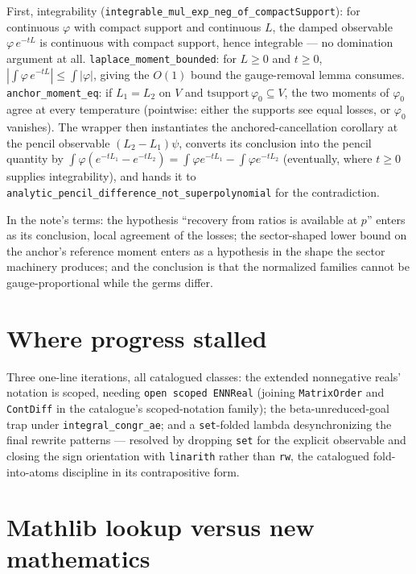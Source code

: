 \documentclass[11pt]{article}
\newcommand{\code}[1]{\texttt{#1}}
\begin{document}
First, integrability
(\code{integrable\_mul\_exp\_neg\_of\_compactSupport}): for
continuous $\varphi$ with compact support and continuous $L$, the damped
observable $\varphi\, e^{-tL}$ is continuous with compact support,
hence integrable --- no domination argument at all.
\code{laplace\_moment\_bounded}: for $L \ge 0$ and $t \ge 0$,
$|\int \varphi\, e^{-tL}| \le \int |\varphi|$, giving the
$O(1)$ bound the gauge-removal lemma consumes.
\code{anchor\_moment\_eq}: if $L_1 = L_2$ on $V$ and
$\mathrm{tsupport}\,\varphi_0 \subseteq V$, the two moments of
$\varphi_0$ agree at every temperature (pointwise: either the
supports see equal losses, or $\varphi_0$ vanishes). The wrapper
then instantiates the anchored-cancellation corollary at the pencil
observable $(L_2 - L_1)\psi$, converts its conclusion into the
pencil quantity by $\int \varphi(e^{-tL_1} - e^{-tL_2}) =
\int \varphi e^{-tL_1} - \int \varphi e^{-tL_2}$ (eventually, where
$t \ge 0$ supplies integrability), and hands it to
\code{analytic\_pencil\_difference\_not\_superpolynomial} for the
contradiction.

In the note's terms: the hypothesis ``recovery from ratios is
available at $p$'' enters as its conclusion, local agreement of the
losses; the sector-shaped lower bound on the anchor's reference
moment enters as a hypothesis in the shape the sector machinery
produces; and the conclusion is that the normalized families cannot
be gauge-proportional while the germs differ.

\section{Where progress stalled}

Three one-line iterations, all catalogued classes: the extended nonnegative reals' notation is scoped, needing \code{open scoped ENNReal}
(joining \code{MatrixOrder} and \code{ContDiff} in the catalogue's
scoped-notation family); the beta-unreduced-goal trap under
\code{integral\_congr\_ae}; and a \code{set}-folded lambda
desynchronizing the final rewrite patterns --- resolved by dropping
\code{set} for the explicit observable and closing the sign
orientation with \code{linarith} rather than \code{rw}, the
catalogued fold-into-atoms discipline in its contrapositive form.

\section{Mathlib lookup versus new mathematics}
\end{document}

